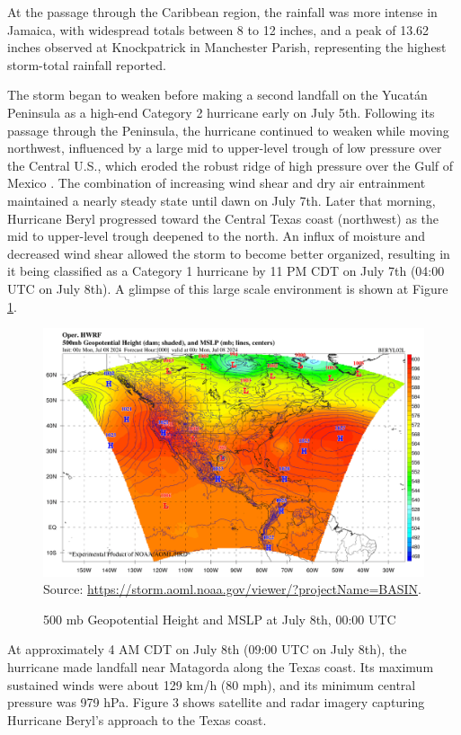 At the passage through the Caribbean region, the rainfall was more intense in Jamaica, with widespread totals between 8 to 12 inches, and a peak of 13.62 inches observed at Knockpatrick in Manchester Parish, representing the highest storm-total rainfall reported.

The storm began to weaken before making a second landfall on the Yucatán Peninsula as a high-end Category 2 hurricane early on July 5th. Following its passage through the Peninsula, the hurricane continued to weaken while moving northwest, influenced by a large mid to upper-level trough of low pressure over the Central U.S., which eroded the robust ridge of high pressure over the Gulf of Mexico \cite{li2025generative}. The combination of increasing wind shear and dry air entrainment maintained a nearly steady state until dawn on July 7th. Later that morning, Hurricane Beryl progressed toward the Central Texas coast (northwest) as the mid to upper-level trough deepened to the north. An influx of moisture and decreased wind shear allowed the storm to become better organized, resulting in it being classified as a Category 1 hurricane by 11 PM CDT on July 7th (04:00 UTC on July 8th). A glimpse of this large scale environment is shown at Figure \ref{fig:mlsp}.

\begin{figure}[h!]
	\centering
	\caption{500 mb Geopotential Height and MSLP at July 8th, 00:00 UTC}
	\label{fig:mlsp}\includegraphics[width=\textwidth,height=\textheight,keepaspectratio]{docs/figuras/chapter5/beryl02l.png}
	\centering
	Source: \url{https://storm.aoml.noaa.gov/viewer/?projectName=BASIN}.
\end{figure}

At approximately 4 AM CDT on July 8th (09:00 UTC on July 8th), the hurricane made landfall near Matagorda along the Texas coast. Its maximum sustained winds were about 129 km/h (80 mph), and its minimum central pressure was 979 hPa. Figure 3 shows satellite and radar imagery capturing Hurricane Beryl's approach to the Texas coast.

